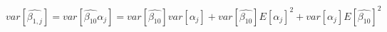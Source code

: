 \begin{equation}
var[\hat{\beta_{1,j}}] = var[\hat{\beta_{10}}\alpha_j] = var[\hat{\beta_{10}}]var[\alpha_j]+var[\hat{\beta_{10}}]E[\alpha_j]^2+var[\alpha_j]E[\hat{\beta_{10}}]^2
\end{equation}